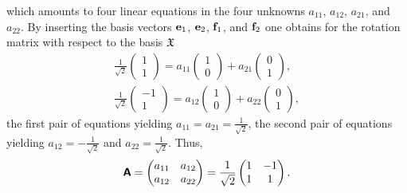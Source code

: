 {\begin{enumerate}
\begin{equation}
\end{equation}
which amounts to four linear equations in the four unknowns $a_{11}$, $a_{12}$,
$a_{21}$, and $a_{22}$.
By
inserting the basis vectors
$ {\bf e}_1$, ${\bf e}_2$, ${\bf f}_1$, and ${\bf f}_2$
one obtains for the rotation matrix with respect to the basis ${\frak X}$
\begin{equation}
\begin{split}
\frac{1}{\sqrt{2}}
\begin{pmatrix}
1\\
1
\end{pmatrix}
=
a_{11}
\begin{pmatrix}
1 \\
0
\end{pmatrix}
+
a_{21}
\begin{pmatrix}
0 \\
1
\end{pmatrix} ,
\\
\frac{1}{\sqrt{2}}
\begin{pmatrix}
-1\\
1
\end{pmatrix}
=
a_{12}
\begin{pmatrix}
1 \\
0
\end{pmatrix}
+
a_{22}
\begin{pmatrix}
0 \\
1
\end{pmatrix}
,
\end{split}
\end{equation}
the first pair of equations yielding
$a_{11}=a_{21}=\frac{1}{\sqrt{2}}$,
the second pair of equations yielding
$a_{12}=-\frac{1}{\sqrt{2}}$ and $a_{22}=\frac{1}{\sqrt{2}}$.
Thus,
\begin{equation}
 \textsf{\textbf{A}}=
\begin{pmatrix}
a_{11}&a_{12}\\
a_{12}&a_{22}
\end{pmatrix}
=
\frac{1}{\sqrt{2}}
\begin{pmatrix}
1&-1\\
1&1
\end{pmatrix}
.
\end{equation}


\end{enumerate}}
